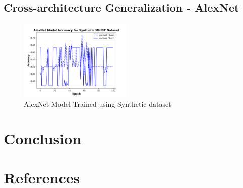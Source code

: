 \documentclass[conference, compsoc]{IEEEtran}
\begin{document}
\subsection{Cross-architecture Generalization - AlexNet}
\begin{figure}[H]
	\centering
	\includegraphics[width=0.48\textwidth]{mhist_alex_acc.png}
	\caption{AlexNet Model Trained using Synthetic dataset}
	\label{fig:mhist_alex_acc}
\end{figure}
\section{Conclusion}

\section{References}
\nocite{*}
\printbibliography
\end{document}
